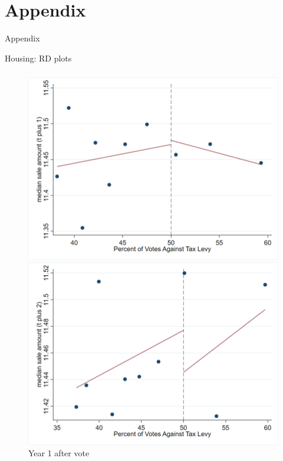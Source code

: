\documentclass{beamer}
\begin{document}
\section{Appendix}

\begin{frame}
    \centering
    \Huge Appendix
\end{frame}

\begin{frame}{Housing: RD plots}
\frametitle{}
\label{all_rd}

\begin{figure}[htbp]
    \centering
    \begin{minipage}[b]{0.35\textwidth}
        \centering
        \includegraphics[width=\textwidth]{assets/imgs/rd_plot_median_sale_amount_t_plus_1_tri_mserd_1_2_within.png}
        \caption{Year 1 after vote}
        \label{fig:image1}
    \end{minipage}
    \hfill
    \begin{minipage}[b]{0.35\textwidth}
        \centering
        \includegraphics[width=\textwidth]{assets/imgs/rd_plot_median_sale_amount_t_plus_2_tri_mserd_1_2_within.png}

\end{minipage}
\end{figure}
\end{frame}
\end{document}
